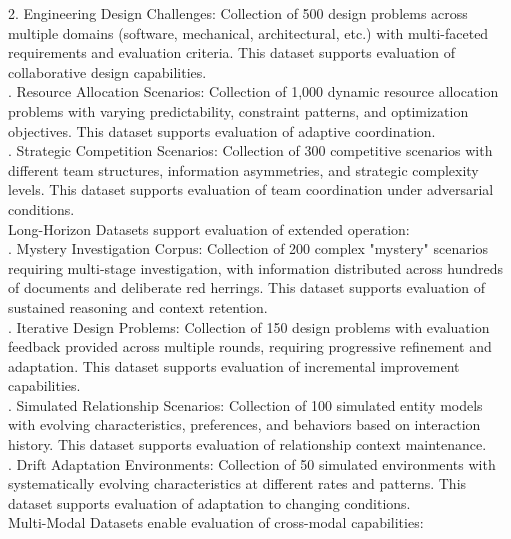 2. Engineering Design Challenges: Collection of 500 design problems across multiple domains (software, mechanical, architectural, etc.) with multi-faceted requirements and evaluation criteria. This dataset supports evaluation of collaborative design capabilities.\\ . Resource Allocation Scenarios: Collection of 1,000 dynamic resource allocation problems with varying predictability, constraint patterns, and optimization objectives. This dataset supports evaluation of adaptive coordination.\\ . Strategic Competition Scenarios: Collection of 300 competitive scenarios with different team structures, information asymmetries, and strategic complexity levels. This dataset supports evaluation of team coordination under adversarial conditions.\\ \newline
Long-Horizon Datasets support evaluation of extended operation:\\ . Mystery Investigation Corpus: Collection of 200 complex "mystery" scenarios requiring multi-stage investigation, with information distributed across hundreds of documents and deliberate red herrings. This dataset supports evaluation of sustained reasoning and context retention.\\ . Iterative Design Problems: Collection of 150 design problems with evaluation feedback provided across multiple rounds, requiring progressive refinement and adaptation. This dataset supports evaluation of incremental improvement capabilities.\\ . Simulated Relationship Scenarios: Collection of 100 simulated entity models with evolving characteristics, preferences, and behaviors based on interaction history. This dataset supports evaluation of relationship context maintenance.\\ . Drift Adaptation Environments: Collection of 50 simulated environments with systematically evolving characteristics at different rates and patterns. This dataset supports evaluation of adaptation to changing conditions.\\ \newline
Multi-Modal Datasets enable evaluation of cross-modal capabilities:\\ \newline
